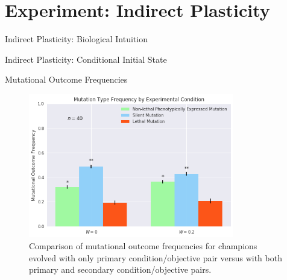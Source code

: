 \section{Experiment: Indirect Plasticity}

\begin{frame}{Indirect Plasticity: Biological Intuition}
  
\end{frame}

\begin{frame}{Indirect Plasticity: Conditional Initial State}

\end{frame}

\begin{frame}{Mutational Outcome Frequencies}
\begin{figure}
    \centering
    \includegraphics[width=0.8\textwidth]{img/mutation_type_indirect}
 	\captionsetup{singlelinecheck=off,justification=raggedright}
  	\caption{Comparison of mutational outcome frequencies for champions evolved with only primary condition/objective pair versus with both primary and secondary condition/objective pairs.}
    \label{fig:mutation_type_indirect}
\end{figure}
\end{frame}


